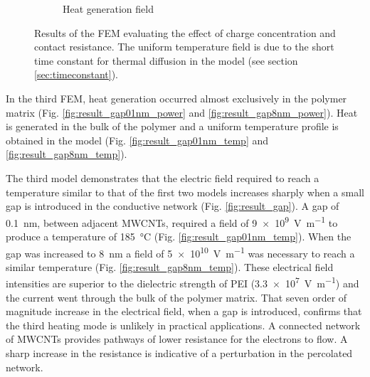\documentclass[11pt,review,times]{article}
\begin{document}
\begin{figure}[htb]
\begin{subfigure}{0.49\textwidth}
		\caption{Heat generation field}
		\label{fig:heat_3D}
	\end{subfigure}
	\caption{Results of the FEM evaluating the effect of charge concentration and contact resistance. The uniform temperature field is due to the short time constant for thermal diffusion in the model (see section \ref{sec:timeconstant}). \cite{Brassard2018_figshare_article1}}
	\label{fig:results_3D}
\end{figure}

\FloatBarrier

In the third FEM, heat generation occurred almost exclusively in the polymer matrix (Fig. \ref{fig:result_gap01nm_power} and \ref{fig:result_gap8nm_power}). 
Heat is generated in the bulk of the polymer and a uniform temperature profile is obtained in the model (Fig. \ref{fig:result_gap01nm_temp} and \ref{fig:result_gap8nm_temp}). 

The third model demonstrates that the electric field required to reach a temperature similar to that of the first two models increases sharply when a small gap is introduced in the conductive network (Fig. \ref{fig:result_gap}). 
A gap of \SI{0.1}{\nano\metre}, between adjacent MWCNTs, required a field of \SI{9e9}{\volt\per\metre} to produce a temperature of \SI{185}{\celsius} (Fig. \ref{fig:result_gap01nm_temp}). 
When the gap was increased to \SI{8}{\nano\metre} a field of \SI{5e10}{\volt\per\metre} was necessary to reach a similar temperature (Fig. \ref{fig:result_gap8nm_temp}). 
These electrical field intensities are superior to the dielectric strength of PEI (\SI{3.3e7}{\volt\per\metre}) and the current went through the bulk of the polymer matrix. 
That seven order of magnitude increase in the electrical field, when a gap is introduced, confirms that the third heating mode is unlikely in practical applications. 
A connected network of MWCNTs provides pathways of lower resistance for the electrons to flow. 
A sharp increase in the resistance is indicative of a perturbation in the percolated network. 
\end{document}
